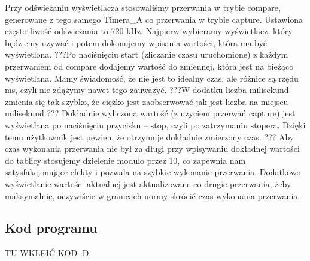 \documentclass[a4paper,titlepage,11pt,floatssmall]{mwrep}
\begin{document}
Przy odświeżaniu wyświetlacza stosowaliśmy przerwania w trybie compare, generowane z tego samego Timera_A co przerwania w trybie capture. Ustawiona częstotliwość odświeżania to 720 kHz. Najpierw wybieramy wyświetlacz, który będziemy używać i potem dokonujemy wpisania wartości, która ma być wyświetlona. 
???Po naciśnięciu start (zliczanie czasu uruchomione) z każdym przerwaniem od compare dodajemy wartość do zmiennej, która jest na bieżąco wyświetlana. Mamy świadomość, że nie jest to idealny czas, ale różnice są rzędu ms, czyli nie zdążymy nawet tego zauważyć. ???W dodatku liczba milisekund zmienia się tak szybko, że ciężko jest zaobserwować jak jest liczba na miejscu milisekund ??? Dokładnie wyliczona wartość (z użyciem przerwań capture) jest wyświetlana po naciśnięciu przycisku – stop, czyli po zatrzymaniu stopera. Dzięki temu użytkownik jest pewien, że otrzymuje dokładnie zmierzony czas. ???
Aby czas wykonania przerwania nie był za długi przy wpisywaniu dokładnej wartości do tablicy stosujemy dzielenie modulo przez 10, co zapewnia nam satysfakcjonujące efekty i pozwala na szybkie wykonanie przerwania. Dodatkowo wyświetlanie wartości aktualnej jest aktualizowane co drugie przerwania, żeby maksymalnie, oczywiście w granicach normy skrócić czas wykonania przerwania. 


\subsection{Kod programu}

TU WKLEIĆ KOD :D
       
\end{document}
